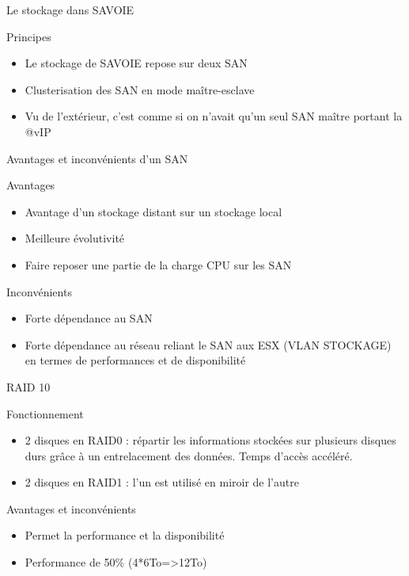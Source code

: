 \begin{frame}{Le stockage dans SAVOIE}
\begin{block}{Principes}
\begin{itemize}
    \item Le stockage de SAVOIE repose sur deux SAN
    \item Clusterisation des SAN en mode maître-esclave
    \item Vu de l'extérieur, c'est comme si on n'avait qu'un seul SAN maître portant la @vIP
\end{itemize}
\end{block}
\end{frame}

\begin{frame}{Avantages et inconvénients d'un SAN}
\begin{block}{Avantages}
\begin{itemize}
    \item Avantage d'un stockage distant sur un stockage local
    \item Meilleure évolutivité
    \item Faire reposer une partie de la charge CPU sur les SAN \pause
\end{itemize}
\end{block}
\begin{block}{Inconvénients}
\begin{itemize}
          \item Forte dépendance au SAN
          \item Forte dépendance au réseau reliant le SAN aux ESX (VLAN STOCKAGE) en termes de performances et de disponibilité
\end{itemize}
\end{block}
\end{frame}

\begin{frame}{RAID 10}
\begin{block}{Fonctionnement}
\begin{itemize}
\item 2 disques en RAID0 : répartir les informations stockées sur plusieurs disques durs grâce à un entrelacement des données. Temps d'accès accéléré.
\item 2 disques en RAID1 : l’un est utilisé en miroir de l'autre
\end{itemize}
\end{block}
\begin{block}{Avantages et inconvénients}
\begin{itemize}
\item Permet la performance et la disponibilité
\item Performance de 50\% (4*6To=>12To)
\end{itemize}
\end{block}
\end{frame}

